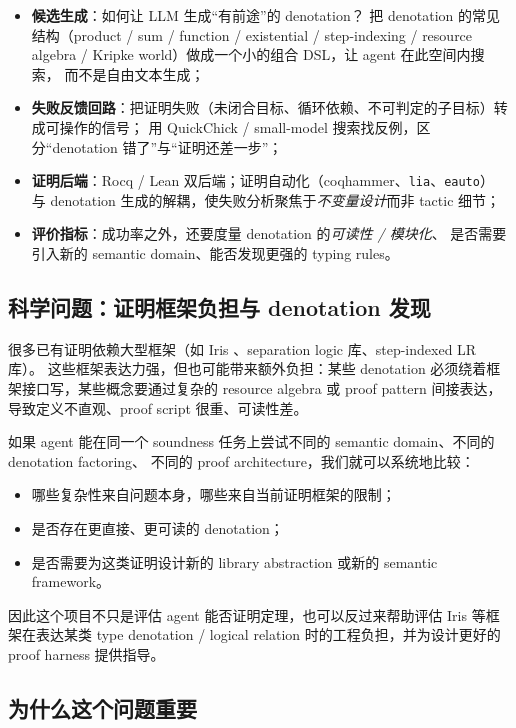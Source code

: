 \begin{itemize}
  \item \textbf{候选生成}：如何让 LLM 生成``有前途''的 denotation？
        把 denotation 的常见结构（product / sum / function / existential / step-indexing /
        resource algebra / Kripke world）做成一个小的组合 DSL，让 agent 在此空间内搜索，
        而不是自由文本生成；
  \item \textbf{失败反馈回路}：把证明失败（未闭合目标、循环依赖、不可判定的子目标）转成可操作的信号；
        用 QuickChick / small-model 搜索找反例，区分``denotation 错了''与``证明还差一步''；
  \item \textbf{证明后端}：Rocq / Lean 双后端；证明自动化（coqhammer、\texttt{lia}、\texttt{eauto}）
        与 denotation 生成的解耦，使失败分析聚焦于\emph{不变量设计}而非 tactic 细节；
  \item \textbf{评价指标}：成功率之外，还要度量 denotation 的\emph{可读性 / 模块化}、
        是否需要引入新的 semantic domain、能否发现更强的 typing rules。
\end{itemize}

\subsection{科学问题：证明框架负担与 denotation 发现}
\label{sec:framework}

很多已有证明依赖大型框架（如 Iris \citep{Jung2018Iris}、separation logic 库、step-indexed LR 库）。
这些框架表达力强，但也可能带来额外负担：某些 denotation 必须绕着框架接口写，某些概念要通过复杂的
resource algebra 或 proof pattern 间接表达，导致定义不直观、proof script 很重、可读性差。

如果 agent 能在同一个 soundness 任务上尝试不同的 semantic domain、不同的 denotation factoring、
不同的 proof architecture，我们就可以系统地比较：
\begin{itemize}
  \item 哪些复杂性来自问题本身，哪些来自当前证明框架的限制；
  \item 是否存在更直接、更可读的 denotation；
  \item 是否需要为这类证明设计新的 library abstraction 或新的 semantic framework。
\end{itemize}
因此这个项目不只是评估 agent 能否证明定理，也可以反过来帮助评估 Iris 等框架在表达某类
type denotation / logical relation 时的工程负担，并为设计更好的 proof harness 提供指导。

\subsection{为什么这个问题重要}

